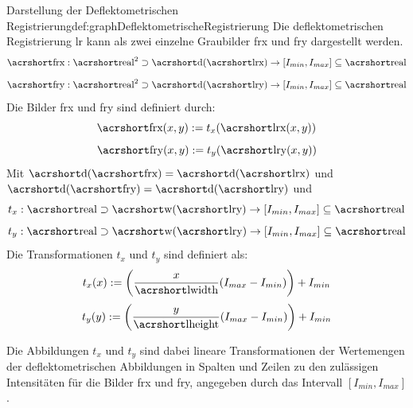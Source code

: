 \begin{Definition}{Darstellung der Deflektometrischen Registrierung}{def:graphDeflektometrischeRegistrierung}
	Die deflektometrischen Registrierung \acrshort{lr} kann als zwei einzelne Graubilder \acrshort{frx} und \acrshort{fry} dargestellt werden.
	\begin{equation*}
		\acrshortmath{frx} : \acrshortmath{real}^2 \supset \acrshortmath{d}(\acrshortmath{lrx}) \rightarrow [I_{min},I_{max}] \subseteq \acrshortmath{real}
	\end{equation*}
	\begin{equation*}
		\acrshortmath{fry} : \acrshortmath{real}^2 \supset \acrshortmath{d}(\acrshortmath{lry}) \rightarrow [I_{min},I_{max}] \subseteq \acrshortmath{real}
	\end{equation*}
	Die Bilder \acrshort{frx} und \acrshort{fry} sind definiert durch:
	\begin{equation*}
		\acrshortmath{frx}(x,y) := t_x(\acrshortmath{lrx}(x,y))
	\end{equation*}
	\begin{equation*}
		\acrshortmath{fry}(x,y) := t_y(\acrshortmath{lry}(x,y))
	\end{equation*}
	Mit $\acrshortmath{d}(\acrshortmath{frx}) = \acrshortmath{d}(\acrshortmath{lrx})$ und $\acrshortmath{d}(\acrshortmath{fry}) = \acrshortmath{d}(\acrshortmath{lry})$ und
	\begin{equation*}
		t_x : \acrshortmath{real} \supset \acrshortmath{w}(\acrshortmath{lry}) \rightarrow [I_{min},I_{max}] \subseteq \acrshortmath{real}
	\end{equation*}
	\begin{equation*}
		t_y : \acrshortmath{real} \supset \acrshortmath{w}(\acrshortmath{lry}) \rightarrow [I_{min},I_{max}] \subseteq \acrshortmath{real}
	\end{equation*}
	Die Transformationen $t_x$ und $t_y$ sind definiert als:
	\begin{equation*}
		t_x(x) := \left(\dfrac{x}{\acrshortmath{lwidth}}(I_{max} - I_{min})\right) + I_{min}
	\end{equation*}
	\begin{equation*}
		t_y(y) := \left(\dfrac{y}{\acrshortmath{lheight}}(I_{max} - I_{min})\right) + I_{min}
	\end{equation*}
\end{Definition}
%
Die Abbildungen $t_x$ und $t_y$ sind dabei lineare Transformationen der Wertemengen der deflektometrischen Abbildungen in Spalten und Zeilen zu den zulässigen Intensitäten für die Bilder \acrshort{frx} und \acrshort{fry}, angegeben durch das Intervall $[I_{min},I_{max}]$.

